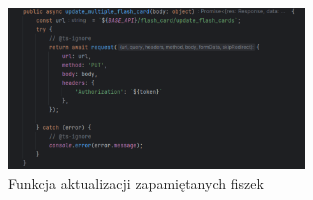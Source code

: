 \begin{figure}[H]
    \centering
    \includegraphics[width=0.7\textwidth]{chapters/chapter_8/screens/update_unmemorized_flash_cards_web}
    \caption{Funkcja aktualizacji zapamiętanych fiszek}
    \label{img:update_unmemorized_flash_cards_web}
\end{figure}